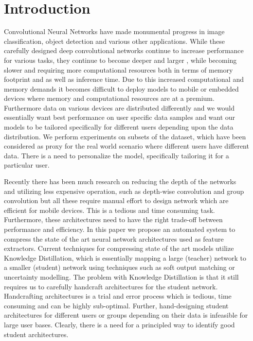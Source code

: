 \documentclass[../main]{subfiles}
\begin{document}
\section{Introduction}

Convolutional Neural Networks have made monumental progress in image classification, object detection and various other applications.
While these carefully designed deep convolutional networks continue to increase performance for various tasks, they continue to become deeper and larger \citep{szegedy2017inception,real2018regularized,hu2017squeeze}, while becoming slower and requiring more computational resources both in terms of memory footprint and as well as inference time.
Due to this increased computational and memory demands it becomes difficult to deploy models to mobile or embedded devices where memory and computational resources are at a premium.
Furthermore data on various devices are distributed differently and we would essentially want best performance on user specific data samples and want our models to be tailored specifically for different users depending upon the data distribution.
We perform experiments on subsets of the dataset, which have been considered as proxy for the real world scenario where different users have different data.
There is a need to personalize the model, specifically tailoring it for a particular user.

Recently there has been much research on reducing the depth of the networks \citep{iandola2016squeezenet} and utilizing less expensive operation, such as depth-wise convolution \citep{howard2017mobilenets} and group convolution \citep{DBLP:journals/corr/ZhangZLS17} but all these require manual effort to design network which are efficient for mobile devices.
This is a tedious and time consuming task.
Furthermore, these architectures need to have the right trade-off between performance and efficiency.
In this paper we propose an automated system to compress the state of the art neural network architectures used as feature extractors.
Current techniques for compressing state of the art models utilize Knowledge Distillation, which is essentially mapping a large (teacher) network to a smaller (student) network using techniques such as soft output matching or uncertainty modelling.
The problem with Knowledge Distillation is that it still requires us to carefully handcraft architectures for the student network.
Handcrafting architectures is a trial and error process which is tedious, time consuming and can be highly sub-optimal.
Further, hand-designing student architectures for different users or groups depending on their data is infeasible for large user bases.
Clearly, there is a need for a principled way to identify good student architectures.
\end{document}
